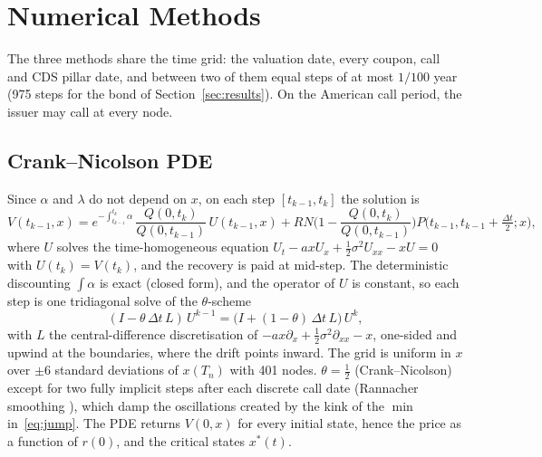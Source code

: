 \documentclass[11pt,a4paper]{article}
\begin{document}
\section{Numerical Methods}\label{sec:methods}
The three methods share the time grid: the valuation date, every coupon, call and CDS pillar date, and between two
of them equal steps of at most $1/100$ year (975 steps for the bond of Section~\ref{sec:results}). On the American
call period, the issuer may call at every node.

\subsection{Crank--Nicolson PDE}
Since $\alpha$ and $\lambda$ do not depend on $x$, on each step $[t_{k-1}, t_k]$ the solution is
\begin{equation}
V(t_{k-1}, x) = e^{-\int_{t_{k-1}}^{t_k}\alpha}\,\frac{Q(0,t_k)}{Q(0,t_{k-1})}\,U(t_{k-1},x)
+ RN\Big(1 - \frac{Q(0,t_k)}{Q(0,t_{k-1})}\Big) P\big(t_{k-1}, t_{k-1} + \tfrac{\Delta t}{2}; x\big),
\end{equation}
where $U$ solves the time-homogeneous equation $U_t - a x U_x + \frac12\sigma^2 U_{xx} - xU = 0$ with
$U(t_k) = V(t_k)$, and the recovery is paid at mid-step. The deterministic discounting $\int\alpha$ is exact (closed
form), and the operator of $U$ is constant, so each step is one tridiagonal solve of the $\theta$-scheme
\begin{equation}
(I - \theta\,\Delta t\,L)\,U^{k-1} = \big(I + (1-\theta)\,\Delta t\,L\big)\,U^{k},
\end{equation}
with $L$ the central-difference discretisation of $-ax\partial_x + \frac12\sigma^2\partial_{xx} - x$, one-sided and
upwind at the boundaries, where the drift points inward. The grid is uniform in $x$ over $\pm 6$ standard deviations
of $x(T_n)$ with 401 nodes. $\theta = \frac12$ (Crank--Nicolson) except for two fully implicit steps after each
discrete call date (Rannacher smoothing \cite{rannacher1984}), which damp the oscillations created by the kink of
the $\min$ in~\eqref{eq:jump}. The PDE returns $V(0,x)$ for every initial state, hence the price as a function of
$r(0)$, and the critical states $x^*(t)$.
\end{document}

